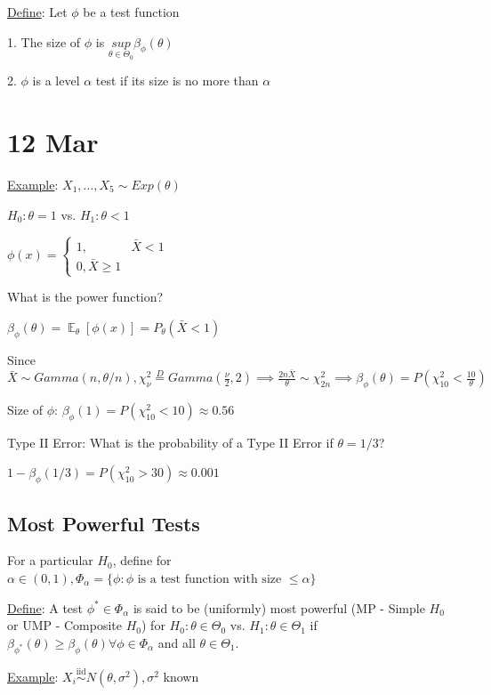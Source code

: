 \documentclass{article}
\DeclareMathOperator{\EX}{\mathbb{E}} %
\newcommand{\iiddist}{\overset{\mathrm{iid}}{\sim}}
\begin{document}
\underline{Define}: Let $\phi$ be a test function

1. The size of $\phi$ is $\underset{\theta \in \Theta_0}{sup}\beta_{\phi}(\theta)$

2. $\phi$ is a level $\alpha$ test if its size is no more than $\alpha$

\section{12 Mar}

\underline{Example}: $X_1, ..., X_5 \sim Exp(\theta)$

$H_0 : \theta = 1$ vs. $H_1 : \theta < 1$

$\phi(x) = \begin{cases} 1, & \bar{X} < 1 \\ 0, \bar{X} \ge 1 \end{cases}$

What is the power function? 

$\beta_{\phi}(\theta) = \EX_{\theta}[\phi(x)] = P_{\theta}(\bar{X} < 1)$

Since $\bar{X} \sim Gamma(n, \theta/n), \chi^2_{\nu} \overset{D}{=} Gamma(\frac{\nu}{2}, 2) \implies \frac{2n\bar{X}}{\theta} \sim \chi^2_{2n} \implies \beta_{\phi}(\theta) = P(\chi^2_{10} < \frac{10}{\theta})$

Size of $\phi$: $\beta_{\phi}(1) = P(\chi^2_{10} < 10) \approx 0.56$

Type II Error: What is the probability of a Type II Error if $\theta = 1/3$?

$1 - \beta_{\phi}(1/3) = P(\chi^2_10 > 30) \approx 0.001$

\subsection{Most Powerful Tests}

For a particular $H_0$, define for $\alpha \in (0, 1), \Phi_{\alpha} = \{\phi:\phi \text{ is a test function with size }\le \alpha \}$

\underline{Define}: A test $\phi^* \in \Phi_{\alpha}$ is said to be (uniformly) most powerful (MP - Simple $H_0$ or UMP - Composite $H_0$) for $H_0: \theta \in \Theta_0$ vs. $H_1: \theta \in \Theta_1$ if $\beta_{\phi^*}(\theta) \ge \beta_{\phi}(\theta) \forall \phi \in \Phi_{\alpha}$ and all $\theta \in \Theta_1$.

\underline{Example}: $X_i \iiddist N(\theta, \sigma^2), \sigma^2$ known
\end{document}

